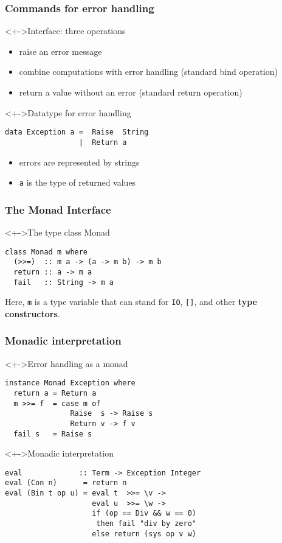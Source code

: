 \documentclass{beamer}
\begin{document}
\begin{frame}[fragile]
  \frametitle{Commands for error handling}
  \begin{block}<+->{Interface: three operations}
    \begin{itemize}
    \item raise an error message
    \item combine computations with error handling (standard bind
      operation)
    \item return a value without an error (standard return operation)
    \end{itemize}
  \end{block}
  \begin{block}<+->{Datatype for error handling}
\begin{lstlisting}
data Exception a =  Raise  String
                 |  Return a
\end{lstlisting}
    \begin{itemize}
    \item errors are represented by strings
    \item \lstinline{a} is the type of returned values
    \end{itemize}
  \end{block}
\end{frame}
\begin{frame}[fragile]
  \frametitle{The Monad Interface}
\begin{block}<+->{The type class Monad}
\begin{lstlisting}
class Monad m where
  (>>=)  :: m a -> (a -> m b) -> m b
  return :: a -> m a
  fail   :: String -> m a
\end{lstlisting}
  Here, \texttt{m} is a type variable that can stand for \texttt{IO},
  \texttt{[]}, and other \textbf{type constructors}. 
\end{block}
\end{frame}     
\begin{frame}[fragile]
  \frametitle{Monadic interpretation}
\begin{block}<+->{Error handling as a monad}
\begin{lstlisting}
instance Monad Exception where
  return a = Return a
  m >>= f  = case m of 
               Raise  s -> Raise s
               Return v -> f v
  fail s   = Raise s
\end{lstlisting}
\end{block}
\begin{block}<+->{Monadic interpretation}
\begin{lstlisting}
eval             :: Term -> Exception Integer
eval (Con n)      = return n
eval (Bin t op u) = eval t  >>= \v ->
                    eval u  >>= \w ->
                    if (op == Div && w == 0) 
                     then fail "div by zero"
                    else return (sys op v w)
\end{lstlisting}
\end{block}
  
\end{frame}
\end{document}
